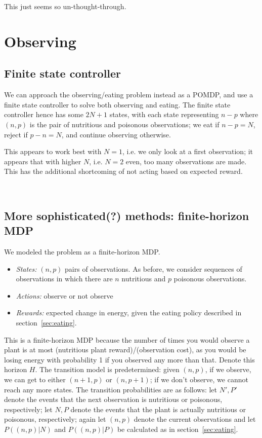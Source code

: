 \documentclass{article}
\begin{document}
This just seems so un-thought-through. 

\section{Observing}
\subsection{Finite state controller}
We can approach the observing/eating problem instead as a POMDP,
and use a finite state controller to solve both observing and eating.
The finite state controller hence has some $2N+1$ states, with
each state representing $n-p$ where $(n,p)$ is the pair of  nutritious
and poisonous observations; we eat if $n-p=N$, reject if $p-n=N$, and
continue observing otherwise. 

This appears to work best with $N=1$, i.e. we only look at a first
observation; it appears that with higher $N$, i.e. $N=2$ even, too many
observations are made.
This has the additional shortcoming of not acting based on expected reward.
 
\\



\subsection{More sophisticated(?) methods: finite-horizon MDP}
We modeled the problem as a finite-horizon MDP.
\begin{itemize}
\item \emph{States:} $(n,p)$ pairs of observations. As before, we consider
  sequences of observations in which there are $n$ nutritious and $p$
  poisonous observations. 
\item \emph{Actions:} observe or not observe
\item \emph{Rewards:} expected change in energy, given the eating policy
  described in section~\ref{sec:eating}. 
\end{itemize}
This is a finite-horizon MDP because the number of times you would
observe a plant is at most (nutritious plant reward)/(observation cost),
as you would be losing energy with probability 1 if you observed any more
than that. Denote this horizon $H$.
The transition model is predetermined: given $(n,p)$, if we observe,
we can get to either $(n+1,p)$ or $(n,p+1)$; if we don't observe, we
cannot reach any more states. 
The transition probabilities are as follows:
let $N',P'$ denote the events that the next observation is nutritious or poisonous,
respectively; let $N,P$ denote the events that the plant is actually nutritious
or poisonous, respectively; again let $(n,p)$ denote the current observations
and let $P((n,p)|N)$ and $P((n,p)|P)$ be calculated as in section~\ref{sec:eating}.
\end{document}
